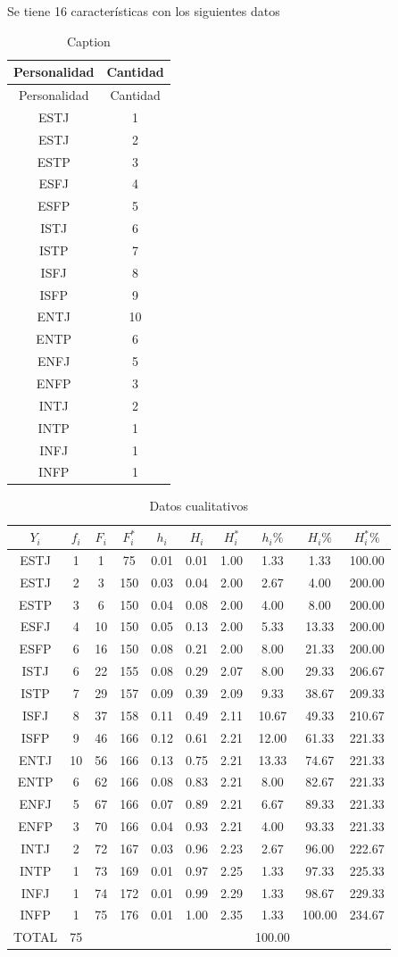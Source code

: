 \documentclass[10pt,]{krantz}
\theoremstyle{definition}
\theoremstyle{definition}
\theoremstyle{definition}
\theoremstyle{definition}
\theoremstyle{remark}
\begin{document}
Se tiene 16 características con los siguientes datos

\begin{longtable}[]{@{}cc@{}}
\caption{\label{tab:w1} Caption}\tabularnewline
\toprule
Personalidad & Cantidad\tabularnewline
\midrule
\endfirsthead
\toprule
Personalidad & Cantidad\tabularnewline
\midrule
\endhead
ESTJ & 1\tabularnewline
ESTJ & 2\tabularnewline
ESTP & 3\tabularnewline
ESFJ & 4\tabularnewline
ESFP & 5\tabularnewline
ISTJ & 6\tabularnewline
ISTP & 7\tabularnewline
ISFJ & 8\tabularnewline
ISFP & 9\tabularnewline
ENTJ & 10\tabularnewline
ENTP & 6\tabularnewline
ENFJ & 5\tabularnewline
ENFP & 3\tabularnewline
INTJ & 2\tabularnewline
INTP & 1\tabularnewline
INFJ & 1\tabularnewline
INFP & 1\tabularnewline
\bottomrule
\end{longtable}

\begin{longtable}[t]{cccccccccc}
\caption{\label{tab:cualitativa}Datos cualitativos}\\
\toprule
$Y_i$ & $f_i$ & $F_i$ & $F_i^*$ & $h_i$ & $H_i$ & $H_i^*$ & $h_i\%$ & $H_i\%$ & $H_i^*\%$\\
\midrule
ESTJ & 1 & 1 & 75 & 0.01 & 0.01 & 1.00 & 1.33 & 1.33 & 100.00\\
ESTJ & 2 & 3 & 150 & 0.03 & 0.04 & 2.00 & 2.67 & 4.00 & 200.00\\
ESTP & 3 & 6 & 150 & 0.04 & 0.08 & 2.00 & 4.00 & 8.00 & 200.00\\
ESFJ & 4 & 10 & 150 & 0.05 & 0.13 & 2.00 & 5.33 & 13.33 & 200.00\\
ESFP & 6 & 16 & 150 & 0.08 & 0.21 & 2.00 & 8.00 & 21.33 & 200.00\\
ISTJ & 6 & 22 & 155 & 0.08 & 0.29 & 2.07 & 8.00 & 29.33 & 206.67\\
ISTP & 7 & 29 & 157 & 0.09 & 0.39 & 2.09 & 9.33 & 38.67 & 209.33\\
ISFJ & 8 & 37 & 158 & 0.11 & 0.49 & 2.11 & 10.67 & 49.33 & 210.67\\
ISFP & 9 & 46 & 166 & 0.12 & 0.61 & 2.21 & 12.00 & 61.33 & 221.33\\
ENTJ & 10 & 56 & 166 & 0.13 & 0.75 & 2.21 & 13.33 & 74.67 & 221.33\\
ENTP & 6 & 62 & 166 & 0.08 & 0.83 & 2.21 & 8.00 & 82.67 & 221.33\\
ENFJ & 5 & 67 & 166 & 0.07 & 0.89 & 2.21 & 6.67 & 89.33 & 221.33\\
ENFP & 3 & 70 & 166 & 0.04 & 0.93 & 2.21 & 4.00 & 93.33 & 221.33\\
INTJ & 2 & 72 & 167 & 0.03 & 0.96 & 2.23 & 2.67 & 96.00 & 222.67\\
INTP & 1 & 73 & 169 & 0.01 & 0.97 & 2.25 & 1.33 & 97.33 & 225.33\\
INFJ & 1 & 74 & 172 & 0.01 & 0.99 & 2.29 & 1.33 & 98.67 & 229.33\\
INFP & 1 & 75 & 176 & 0.01 & 1.00 & 2.35 & 1.33 & 100.00 & 234.67\\
TOTAL & 75 &  &  &  &  &  & 100.00 &  & \\
\bottomrule
\end{longtable}
\end{document}
